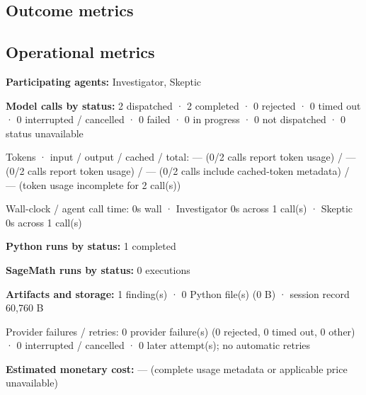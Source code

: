 \documentclass[11pt]{article}
\begin{document}
\subsection{Outcome metrics}
\subsection{Operational metrics}
\textbf{Participating agents:} Investigator, Skeptic\par
\textbf{Model calls by status:} 2 dispatched · 2 completed · 0 rejected · 0 timed out · 0 interrupted / cancelled · 0 failed · 0 in progress · 0 not dispatched · 0 status unavailable\par
Tokens · input / output / cached / total: — (0/2 calls report token usage) / — (0/2 calls report token usage) / — (0/2 calls include cached-token metadata) / — (token usage incomplete for 2 call(s))\par
Wall-clock / agent call time: 0s wall · Investigator 0s across 1 call(s) · Skeptic 0s across 1 call(s)\par
\textbf{Python runs by status:} 1 completed\par
\textbf{SageMath runs by status:} 0 executions\par
\textbf{Artifacts and storage:} 1 finding(s) · 0 Python file(s) (0 B) · session record 60,760 B\par
Provider failures / retries: 0 provider failure(s) (0 rejected, 0 timed out, 0 other) · 0 interrupted / cancelled · 0 later attempt(s); no automatic retries\par
\textbf{Estimated monetary cost:} — (complete usage metadata or applicable price unavailable)\par
\end{document}

